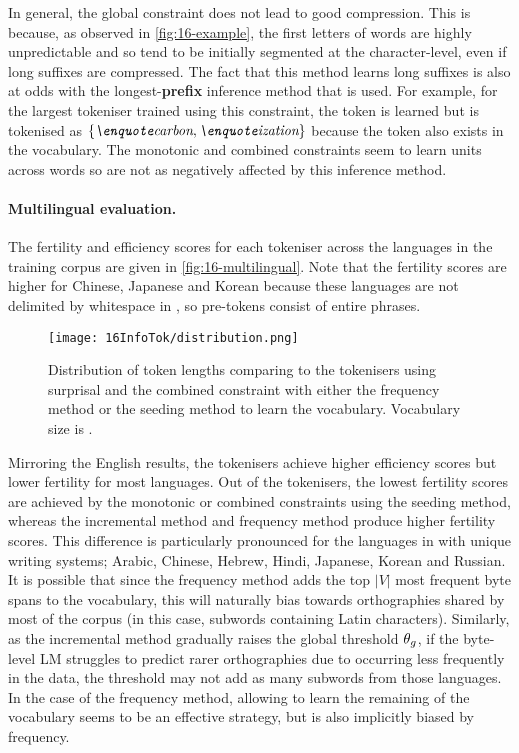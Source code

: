 In general, the global constraint does not lead to good compression. This is because, as observed in \cref{fig:16-example}, the first letters of words are highly unpredictable and so tend to be initially segmented at the character-level, even if long suffixes are compressed. The fact that this method learns long suffixes is also at odds with the longest-\textbf{prefix} inference method that is used. For example, for the largest tokeniser trained using this constraint, the token  is learned but  is tokenised as \(\{\ex{carbon},\ex{ization}\}\) because the token  also exists in the vocabulary. The monotonic and combined constraints seem to learn units across words so are not as negatively affected by this inference method.

\paragraph{Multilingual evaluation.}

The fertility and \renyi efficiency scores for each tokeniser across the  languages in the training corpus are given in \cref{fig:16-multilingual}. Note that the fertility scores are higher for Chinese, Japanese and Korean because these languages are not delimited by whitespace in \commoncorpus, so pre-tokens consist of entire phrases. 

\begin{figure}[!t]
    \centering
    \texttt{[image: 16InfoTok/distribution.png]}
    \caption{Distribution of token lengths comparing \bpewp to the \bytespan tokenisers using surprisal and the combined constraint with either the frequency method or the seeding method to learn the vocabulary. Vocabulary size is .}
    \label{fig:16-distribution}
\end{figure}

Mirroring the English results, the \bytespan tokenisers achieve higher \renyi efficiency scores but lower fertility for most languages. Out of the \bytespan tokenisers, the lowest fertility scores are achieved by the monotonic or combined constraints using the seeding method, whereas the incremental method and frequency method produce higher fertility scores. This difference is particularly pronounced for the languages in \commoncorpus with unique writing systems; Arabic, Chinese, Hebrew, Hindi, Japanese, Korean and Russian. It is possible that since the frequency method adds the top $|V|$ most frequent byte spans to the vocabulary, this will naturally bias towards orthographies shared by most of the corpus (in this case, subwords containing Latin characters). Similarly, as the incremental method gradually raises the global threshold $\theta_g$, if the byte-level LM struggles to predict rarer orthographies due to occurring less frequently in the data, the threshold may not add as many subwords from those languages. In the case of the frequency method, allowing \bpe to learn the remaining  of the vocabulary seems to be an effective strategy, but \bpe is also implicitly biased by frequency.

